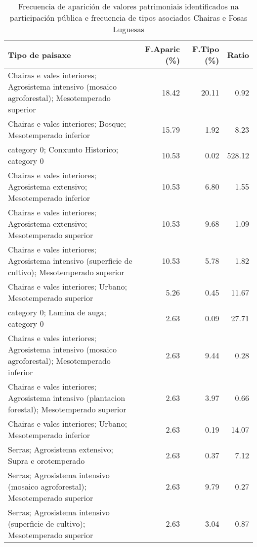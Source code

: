 \begin{table}[p]
\centering
\caption{Frecuencia de aparición de valores patrimoniais identificados na participación pública e frecuencia de tipos asociados Chairas e Fosas Luguesas} 
\label{vsixotpat6}
\begin{tabular}{lrrr}
  \hline
Tipo de paisaxe & F.Aparic (\%) & F.Tipo (\%) & Ratio \\ 
  \hline
Chairas e vales interiores; Agrosistema intensivo (mosaico agroforestal); Mesotemperado superior & 18.42 & 20.11 & 0.92 \\ 
  Chairas e vales interiores; Bosque; Mesotemperado inferior & 15.79 & 1.92 & 8.23 \\ 
  category 0; Conxunto Historico; category 0 & 10.53 & 0.02 & 528.12 \\ 
  Chairas e vales interiores; Agrosistema extensivo; Mesotemperado inferior & 10.53 & 6.80 & 1.55 \\ 
  Chairas e vales interiores; Agrosistema extensivo; Mesotemperado superior & 10.53 & 9.68 & 1.09 \\ 
  Chairas e vales interiores; Agrosistema intensivo (superficie de cultivo); Mesotemperado superior & 10.53 & 5.78 & 1.82 \\ 
  Chairas e vales interiores; Urbano; Mesotemperado superior & 5.26 & 0.45 & 11.67 \\ 
  category 0; Lamina de auga; category 0 & 2.63 & 0.09 & 27.71 \\ 
  Chairas e vales interiores; Agrosistema intensivo (mosaico agroforestal); Mesotemperado inferior & 2.63 & 9.44 & 0.28 \\ 
  Chairas e vales interiores; Agrosistema intensivo (plantacion forestal); Mesotemperado superior & 2.63 & 3.97 & 0.66 \\ 
  Chairas e vales interiores; Urbano; Mesotemperado inferior & 2.63 & 0.19 & 14.07 \\ 
  Serras; Agrosistema extensivo; Supra e orotemperado & 2.63 & 0.37 & 7.12 \\ 
  Serras; Agrosistema intensivo (mosaico agroforestal); Mesotemperado superior & 2.63 & 9.79 & 0.27 \\ 
  Serras; Agrosistema intensivo (superficie de cultivo); Mesotemperado superior & 2.63 & 3.04 & 0.87 \\ 
   \hline
\end{tabular}
\end{table}
